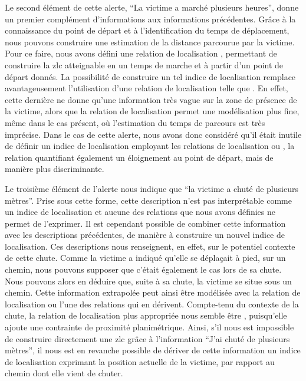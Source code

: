 Le second élément de cette alerte, \enquote{La victime a marché
  plusieurs heures}, donne un premier complément d'informations aux
informations précédentes. Grâce à la connaissance du point de départ
et à l'identification du temps de déplacement, nous pouvons construire
une estimation de la distance parcourue par la victime. Pour ce faire,
nous avons défini une relation de localisation
, permettant de construire la
\ac{zlc} atteignable en un temps de marche et à partir d'un point de
départ donnés. La possibilité de construire un tel indice de
localisation remplace avantageusement l'utilisation d'une relation de
localisation telle que . En effet, cette
dernière ne donne qu'une information très vague sur la zone de
présence de la victime, alors que la relation de localisation
 permet une modélisation plus
fine, même dans le cas présent, où l'estimation du temps de parcours
est très imprécise. Dans le cas de cette alerte, nous avons donc
considéré qu'il était inutile de définir un indice de localisation
employant les relations de localisation 
ou , la relation
 quantifiant également un
éloignement au point de départ, mais de manière plus discriminante.

Le troisième élément de l'alerte nous indique que \enquote{la victime
  a chuté de plusieurs mètres}. Prise sous cette forme, cette
description n'est pas interprétable comme un indice de localisation et
aucune des relations que nous avons définies ne permet de
l'exprimer. Il est cependant possible de combiner cette information
avec les descriptions précédentes, de manière à construire un nouvel
indice de localisation. Ces descriptions nous renseignent, en effet,
sur le potentiel contexte de cette chute. Comme la victime a indiqué
qu'elle se déplaçait à pied, sur un chemin, nous pouvons supposer que
c'était également le cas lors de sa chute. Nous pouvons alors en
déduire que, suite à sa chute, la victime se situe sous un
chemin. Cette information extrapolée peut ainsi être modélisée avec la
relation de localisation  ou l'une des
relations qui en dérivent. Compte-tenu du contexte de la chute, la
relation de localisation plus appropriée nous semble être
, puisqu’elle ajoute une contrainte de
proximité planimétrique. Ainsi, s'il nous est impossible de construire
directement une \ac{zlc} grâce à l'information \enquote{J'ai chuté de
  plusieurs mètres}, il nous est en revanche possible de dériver de
cette information un indice de localisation exprimant la position
actuelle de la victime, par rapport au chemin dont elle vient de
chuter.

